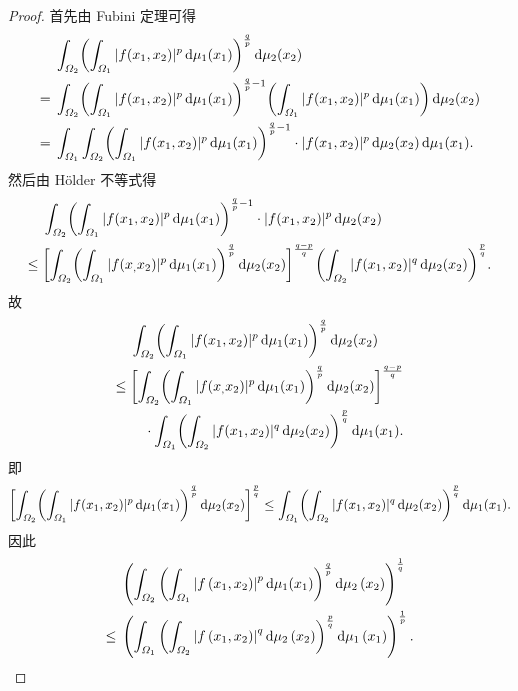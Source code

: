 \begin{proof}
    首先由 Fubini 定理可得
    \begin{align*}
        & \int_{\varOmega_2}\biggl(\int_{\varOmega_1}|f(x_1,x_2)|^p\diff\mu_1(x_1)\biggr)^{\frac{q}{p}}\diff\mu_2(x_2) \\
    ={} & \int_{\varOmega_2}\biggl(\int_{\varOmega_1}|f(x_1,x_2)|^p\diff\mu_1(x_1)\biggr)^{\frac{q}{p}-1}\biggl(\int_{\varOmega_1}|f(x_1,x_2)|^p\diff\mu_1(x_1)\biggr)\diff\mu_2(x_2) \\
    ={} & \int_{\varOmega_1}\int_{\varOmega_2}\biggl(\int_{\varOmega_1}|f(x_1,x_2)|^p\diff\mu_1(x_1)\biggr)^{\frac{q}{p}-1}\cdot |f(x_1,x_2)|^p\diff\mu_2(x_2)\diff\mu_1(x_1).
    \end{align*}
    然后由 H\"older 不等式得
    \begin{align*}
        & \int_{\varOmega_2}\biggl(\int_{\varOmega_1}|f(x_1,x_2)|^p\mathop{}\!\mathrm{d}\mu_1(x_1)\biggr)^{\frac{q}{p}-1}\cdot |f(x_1,x_2)|^p\mathop{}\!\mathrm{d}\mu_2(x_2) \\
    \leq{} & \biggl[\int_{\varOmega_2}\biggl(\int_{\varOmega_1}|f(x_,x_2)|^p\mathop{}\!\mathrm{d}\mu_1(x_1)\biggr)^{\frac{q}{p}}\mathop{}\!\mathrm{d}\mu_2(x_2)\biggr]^{\frac{q-p}{q}}\biggl(\int_{\varOmega_2}|f(x_1,x_2)|^q\mathop{}\!\mathrm{d}\mu_2(x_2)\biggr)^{\frac{p}{q}}.
    \end{align*}
    故
    \begin{align*}
        & \int_{\varOmega_2}\biggl(\int_{\varOmega_1}|f(x_1,x_2)|^p\mathop{}\!\mathrm{d}\mu_1(x_1)\biggr)^{\frac{q}{p}}\mathop{}\!\mathrm{d}\mu_2(x_2) \\
    \leq{} & \biggl[\int_{\varOmega_2}\biggl(\int_{\varOmega_1}|f(x_,x_2)|^p
             \mathop{}\!\mathrm{d}\mu_1(x_1)\biggr)^{\frac{q}{p}}\mathop{}\!\mathrm{d}\mu_2(x_2)\biggr]^{\frac{q-p}{q}} \\
        & \quad\cdot\int_{\varOmega_1}\biggl(\int_{\varOmega_2}|f(x_1,x_2)|^q
          \mathop{}\!\mathrm{d}\mu_2(x_2)\biggr)^{\frac{p}{q}}\mathop{}\!\mathrm{d}\mu_1(x_1).
    \end{align*}
    即
    \[\biggl[\int_{\varOmega_2}\biggl(\int_{\varOmega_1}|f(x_1,x_2)|^p\mathop{}\!\mathrm{d}\mu_1(x_1)\biggr)^{\frac{q}{p}}\mathop{}\!\mathrm{d}\mu_2(x_2)\biggr]^{\frac{p}{q}}\leq\int_{\varOmega_1}\biggl(\int_{\varOmega_2}|f(x_1,x_2)|^q\mathop{}\!\mathrm{d}\mu_2(x_2)\biggr)^{\frac{p}{q}}\mathop{}\!\mathrm{d}\mu_1(x_1).\]
    因此
    \begin{align*}
        & \left(\int_{\varOmega_{2}}\left(\int_{\varOmega_{1}}\left|f\left(x_{1}, x_{2}\right)\right|^{p}\mathop{}\!\mathrm{d}\mu_{1}(x_{1})\right)^{\frac{q}{p}}\mathop{}\!\mathrm{d} \mu_{2}\left(x_{2}\right)\right)^{\frac{1}{q}} \\
    \leq{} & \left(\int_{\varOmega_{1}}\left(\int_{\varOmega_{2}}\left|f\left(x_{1}, x_{2}\right)\right|^{q}\mathop{}\!\mathrm{d}\mu_{2}\left(x_{2}\right)\right)^{\frac{p}{q}}\mathop{}\!\mathrm{d}\mu_{1}\left(x_{1}\right)\right)^{\frac{1}{p}}.\qedhere
    \end{align*}
\end{proof}



